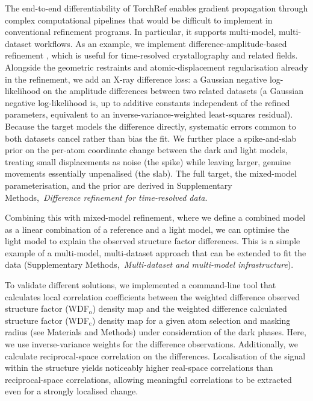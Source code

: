\documentclass{iucrjournals}
\newcommand{\suppref}[1]{Supplementary Methods,~\emph{#1}}
\newcommand{\suppparen}[1]{(\suppref{#1})}
\begin{document}
The end-to-end differentiability of TorchRef enables gradient propagation
through complex computational pipelines that would be difficult to implement in
conventional refinement programs.
In particular, it supports multi-model, multi-dataset workflows.
As an example, we implement difference-amplitude-based refinement
\cite{berendzen_difference_1995}, which is useful for time-resolved
crystallography and related fields.
Alongside the geometric restraints and atomic-displacement regularisation
already in the refinement, we add an X-ray difference loss: a Gaussian negative
log-likelihood on the amplitude differences between two related datasets
(a Gaussian negative log-likelihood is, up to additive constants independent of
the refined parameters, equivalent to an inverse-variance-weighted
least-squares residual).
Because the target models the difference directly, systematic errors common to 
both datasets cancel rather than bias the fit. We further place a
spike-and-slab prior on the per-atom coordinate change between the dark and light models, 
treating small displacements as noise (the spike) while leaving larger, genuine movements 
essentially unpenalised (the slab). The full target, the mixed-model parameterisation, and 
the prior are derived in \suppref{Difference refinement for time-resolved data}.

Combining this with mixed-model refinement, where we define a combined model as
a linear combination of a reference and a light model, we can optimise the
light model to explain the observed structure factor differences.
This is a simple example of a multi-model, multi-dataset approach that can be
extended to fit the data \suppparen{Multi-dataset and multi-model infrastructure}.

To validate different solutions, we implemented a command-line tool that
calculates local correlation coefficients between the weighted difference
observed structure factor (WDF$_\mathrm{o}$) density map and the weighted
difference calculated structure factor (WDF$_\mathrm{c}$) density map for a
given atom selection and masking radius (see Materials and Methods) under
consideration of the dark phases.
Here, we use inverse-variance weights for the difference observations.
Additionally, we calculate reciprocal-space correlation on the differences.
Localisation of the signal within the structure yields noticeably higher
real-space correlations than reciprocal-space correlations, allowing
meaningful correlations to be extracted even for a strongly localised
change.
\end{document}
